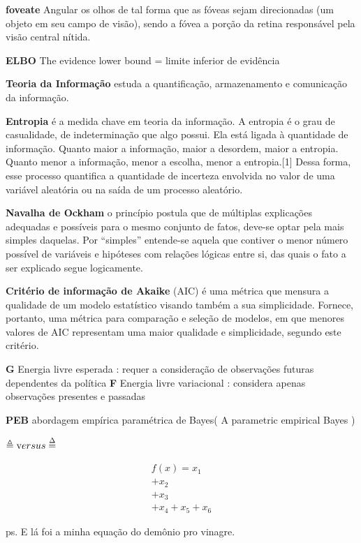 \documentclass[
  12pt,
]{book}
\begin{document}
\textbf{foveate} Angular os olhos de tal forma que as fóveas sejam direcionadas (um objeto em seu campo de visão), sendo a fóvea a porção da retina responsável pela visão central nítida.

\textbf{ELBO} The evidence lower bound = limite inferior de evidência

\textbf{Teoria da Informação} estuda a quantificação, armazenamento e comunicação da informação.

\textbf{Entropia} é a medida chave em teoria da informação. A entropia é o grau de casualidade, de indeterminação que algo possui. Ela está ligada à quantidade de informação. Quanto maior a informação, maior a desordem, maior a entropia. Quanto menor a informação, menor a escolha, menor a entropia.{[}1{]} Dessa forma, esse processo quantifica a quantidade de incerteza envolvida no valor de uma variável aleatória ou na saída de um processo aleatório.

\textbf{Navalha de Ockham} o princípio postula que de múltiplas explicações adequadas e possíveis para o mesmo conjunto de fatos, deve-se optar pela mais simples daquelas. Por ``simples'' entende-se aquela que contiver o menor número possível de variáveis e hipóteses com relações lógicas entre si, das quais o fato a ser explicado segue logicamente.

\textbf{Critério de informação de Akaike} (AIC) é uma métrica que mensura a qualidade de um modelo estatístico visando também a sua simplicidade. Fornece, portanto, uma métrica para comparação e seleção de modelos, em que menores valores de AIC representam uma maior qualidade e simplicidade, segundo este critério.

\textbf{G} Energia livre esperada : requer a consideração de observações futuras dependentes da política
\textbf{F} Energia livre variacional : considera apenas observações presentes e passadas

\textbf{PEB} abordagem empírica paramétrica de Bayes( A parametric empirical Bayes )

\(\triangleq \text versus \overset{\Delta}{=}\)

\[ \begin{align} f(x) =  x_1  \\+ x_2 \\ + x_3 \\ + x_4 + x_5 + x_6\end{align}\]

ps. E lá foi a minha equação do demônio pro vinagre.

  
\end{document}
